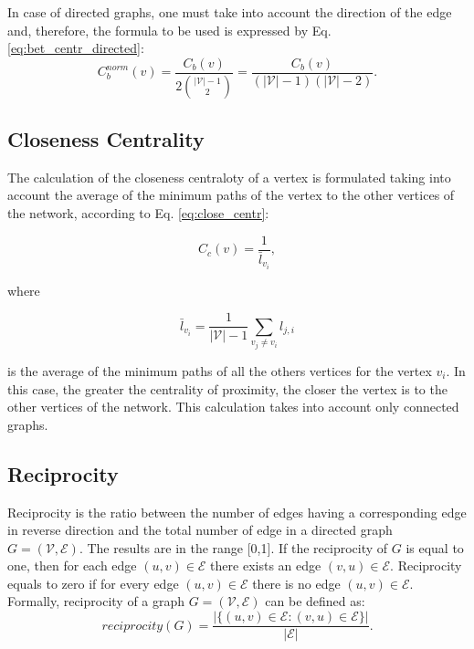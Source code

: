 In case of directed graphs, one must take into account the direction of the edge and, therefore, the formula to be used is expressed by Eq. \ref{eq:bet_centr_directed}:
\begin{equation}
    \label{eq:bet_centr_directed}
	C^{norm}_b(v) = \frac{C_b(v)}{2\binom{|\mathcal{V}|-1}{2}} = \frac{C_b(v)}{(|\mathcal{V}|-1)(|\mathcal{V}|-2)}.
\end{equation}


\subsection*{Closeness Centrality}
\label{subsec:close_centr}
The calculation of the closeness centraloty of a vertex is formulated taking into account the average of the minimum paths of the vertex to the other vertices of the network, according to Eq. \ref{eq:close_centr}:

\begin{equation}
\label{eq:close_centr}
    C_c(v) = \frac{1}{\bar{l}_{v_i}},
\end{equation}

where 

\begin{equation}
    \bar{l}_{v_i} = \frac{1}{|\mathcal{V}|-1}\sum_{v_j \neq v_i}l_{j,i}
\end{equation}

is the average of the minimum paths of all the others vertices for the vertex $v_i$. In this case, the greater the centrality of proximity, the closer the vertex is to the other vertices of the network. This calculation takes into account only connected graphs.


\subsection*{Reciprocity}
\label{subsec:reciprocity}
Reciprocity is the ratio between the number of edges having a corresponding edge in reverse direction and the total number of edge in a directed graph  $G = (\mathcal{V}, \mathcal{E})$. The results are in the range [0,1].  If the reciprocity of  $G$ is equal to one, then  for each edge $(u,v)\in\mathcal{E}$ there exists an edge $(v,u)\in\mathcal{E}$. Reciprocity equals to zero if  for every edge $(u,v)\in\mathcal{E}$ there is no edge $(u, v)\in\mathcal{E}$. Formally, reciprocity  of a graph $G = (\mathcal{V}, \mathcal{E})$ can be defined as:  
\begin{equation}\label{eq:reciprocity}
  reciprocity(G)=\frac{|\{(u,v)\in\mathcal{E}: (v,u) \in \mathcal{E}\}|}{|\mathcal{E}|}.
\end{equation}

